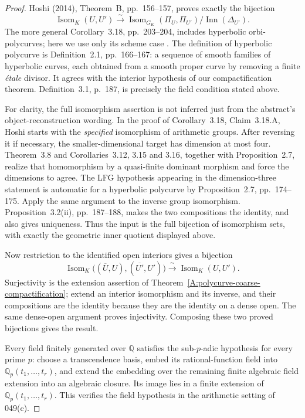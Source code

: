 \begin{proof}
Hoshi (2014), Theorem~B, pp.~156--157, proves exactly the bijection
\[
 \operatorname{Isom}_K(U,U')
  \xrightarrow{\;\sim\;}
 \operatorname{Isom}_{G_K}(\Pi_U,\Pi_{U'})/
                    \operatorname{Inn}(\Delta_{U'}).
\]
The more general Corollary~3.18, pp.~203--204, includes
hyperbolic orbi-polycurves; here we use only its scheme case
\cite{A567_Hoshi2014}. The definition of hyperbolic polycurve is
Definition~2.1, pp.~166--167: a sequence of smooth families of
hyperbolic curves, each obtained from a smooth proper curve by
removing a finite \emph{\'etale} divisor. It agrees with the
interior hypothesis of our compactification theorem.
Definition~3.1, p.~187, is precisely the field condition stated above.

For clarity, the full isomorphism assertion is not inferred just
from the abstract's object-reconstruction wording. In the proof of
Corollary~3.18, Claim~3.18.A, Hoshi starts with the \emph{specified}
isomorphism of arithmetic groups. After reversing it if necessary,
the smaller-dimensional target has dimension at most four.
Theorem~3.8 and Corollaries~3.12, 3.15 and 3.16, together with
Proposition~2.7, realize that homomorphism by
a quasi-finite dominant morphism and force the dimensions to agree.
The LFG hypothesis appearing in the dimension-three statement is
automatic for a hyperbolic polycurve by Proposition~2.7,
pp.~174--175. Apply the same argument to the inverse group
isomorphism. Proposition~3.2(ii), pp.~187--188, makes the two
compositions the identity, and also gives uniqueness. Thus the
input is the full bijection of isomorphism sets, with exactly the
geometric inner quotient displayed above.

Now restriction to the identified open interiors gives a bijection
\[
 \operatorname{Isom}_K\bigl((\overline U,U),
                         (\overline {U'},U')\bigr)
 \xrightarrow{\;\sim\;}
 \operatorname{Isom}_K(U,U').
\]
Surjectivity is the extension assertion of
Theorem~\ref{A:polycurve-coarse-compactification}; extend an interior
isomorphism and its inverse, and their compositions are the identity
because they are the identity on a dense open. The same dense-open
argument proves injectivity. Composing these two proved bijections
gives the result.

Every field finitely generated over $\mathbb Q$ satisfies the
sub-$p$-adic hypothesis for every prime $p$: choose a transcendence
basis, embed its rational-function field into
$\mathbb Q_p(t_1,\ldots,t_r)$, and extend the embedding over the
remaining finite algebraic field extension into an algebraic
closure. Its image lies in a finite extension of
$\mathbb Q_p(t_1,\ldots,t_r)$. This verifies the field hypothesis
in the arithmetic setting of 049(c).\qedhere
\end{proof}

